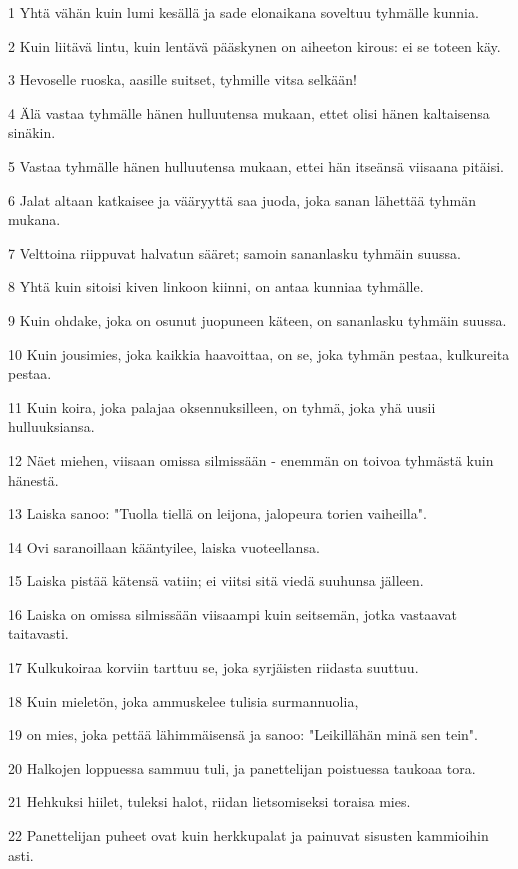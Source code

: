\par 1 Yhtä vähän kuin lumi kesällä ja sade elonaikana soveltuu tyhmälle kunnia.
\par 2 Kuin liitävä lintu, kuin lentävä pääskynen on aiheeton kirous: ei se toteen käy.
\par 3 Hevoselle ruoska, aasille suitset, tyhmille vitsa selkään!
\par 4 Älä vastaa tyhmälle hänen hulluutensa mukaan, ettet olisi hänen kaltaisensa sinäkin.
\par 5 Vastaa tyhmälle hänen hulluutensa mukaan, ettei hän itseänsä viisaana pitäisi.
\par 6 Jalat altaan katkaisee ja vääryyttä saa juoda, joka sanan lähettää tyhmän mukana.
\par 7 Velttoina riippuvat halvatun sääret; samoin sananlasku tyhmäin suussa.
\par 8 Yhtä kuin sitoisi kiven linkoon kiinni, on antaa kunniaa tyhmälle.
\par 9 Kuin ohdake, joka on osunut juopuneen käteen, on sananlasku tyhmäin suussa.
\par 10 Kuin jousimies, joka kaikkia haavoittaa, on se, joka tyhmän pestaa, kulkureita pestaa.
\par 11 Kuin koira, joka palajaa oksennuksilleen, on tyhmä, joka yhä uusii hulluuksiansa.
\par 12 Näet miehen, viisaan omissa silmissään - enemmän on toivoa tyhmästä kuin hänestä.
\par 13 Laiska sanoo: "Tuolla tiellä on leijona, jalopeura torien vaiheilla".
\par 14 Ovi saranoillaan kääntyilee, laiska vuoteellansa.
\par 15 Laiska pistää kätensä vatiin; ei viitsi sitä viedä suuhunsa jälleen.
\par 16 Laiska on omissa silmissään viisaampi kuin seitsemän, jotka vastaavat taitavasti.
\par 17 Kulkukoiraa korviin tarttuu se, joka syrjäisten riidasta suuttuu.
\par 18 Kuin mieletön, joka ammuskelee tulisia surmannuolia,
\par 19 on mies, joka pettää lähimmäisensä ja sanoo: "Leikillähän minä sen tein".
\par 20 Halkojen loppuessa sammuu tuli, ja panettelijan poistuessa taukoaa tora.
\par 21 Hehkuksi hiilet, tuleksi halot, riidan lietsomiseksi toraisa mies.
\par 22 Panettelijan puheet ovat kuin herkkupalat ja painuvat sisusten kammioihin asti.

